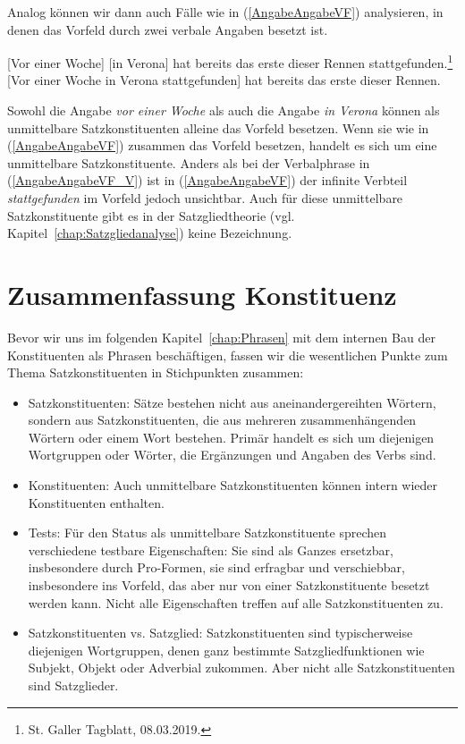 Analog können wir dann auch Fälle wie in (\ref{AngabeAngabeVF}) analysieren, in denen das Vorfeld durch zwei verbale Angaben besetzt ist.

\ea 
\ea \label{AngabeAngabeVF} [Vor einer Woche] [in Verona] hat bereits das erste dieser Rennen stattgefunden.\footnote{St. Galler Tagblatt, 08.03.2019.}
\ex \label{AngabeAngabeVF_V} [Vor einer Woche in Verona stattgefunden] hat bereits das erste dieser Rennen.
\z 
\z 

Sowohl die Angabe \textit{vor einer Woche} als auch die Angabe \textit{in Verona} können als unmittelbare Satzkonstituenten alleine das Vorfeld besetzen. Wenn sie wie in (\ref{AngabeAngabeVF}) zusammen das Vorfeld besetzen, handelt es sich um eine unmittelbare Satzkonstituente. Anders als bei der Verbalphrase in (\ref{AngabeAngabeVF_V}) ist in (\ref{AngabeAngabeVF}) der infinite Verbteil \textit{stattgefunden} im Vorfeld jedoch unsichtbar. Auch für diese unmittelbare Satzkonstituente gibt es in der Satzgliedtheorie (vgl. Kapitel~\ref{chap:Satzgliedanalyse}) keine Bezeichnung.


\section{Zusammenfassung Konstituenz}\label{section:Zfsg_Konstituenz}

Bevor wir uns im folgenden Kapitel~\ref{chap:Phrasen} mit dem internen Bau der Konstituenten als Phrasen beschäftigen, fassen wir die wesentlichen Punkte zum Thema Satzkonstituenten in Stichpunkten zusammen:

\begin{itemize}

\item Satzkonstituenten: Sätze bestehen nicht aus aneinandergereihten Wörtern, sondern aus Satzkonstituenten, die aus mehreren zusammenhängenden Wörtern oder einem Wort bestehen. Primär handelt es sich um diejenigen Wortgruppen oder Wörter, die Ergänzungen und Angaben des Verbs sind.

\item Konstituenten: Auch unmittelbare Satzkonstituenten können intern wieder Konstituenten enthalten.

\item Tests: Für den Status als unmittelbare Satzkonstituente sprechen verschiedene testbare Eigenschaften: Sie sind als Ganzes ersetzbar, insbesondere durch Pro-Formen, sie sind erfragbar und verschiebbar, insbesondere ins Vorfeld, das aber nur von einer Satzkonstituente besetzt werden kann. Nicht alle Eigenschaften treffen auf alle Satzkonstituenten zu.

\item Satzkonstituenten vs. Satzglied: Satzkonstituenten sind typischerweise diejenigen Wortgruppen, denen ganz bestimmte Satzgliedfunktionen wie Subjekt, Objekt oder Adverbial zukommen. Aber nicht alle Satzkonstituenten sind Satzglieder.  

\end{itemize}

